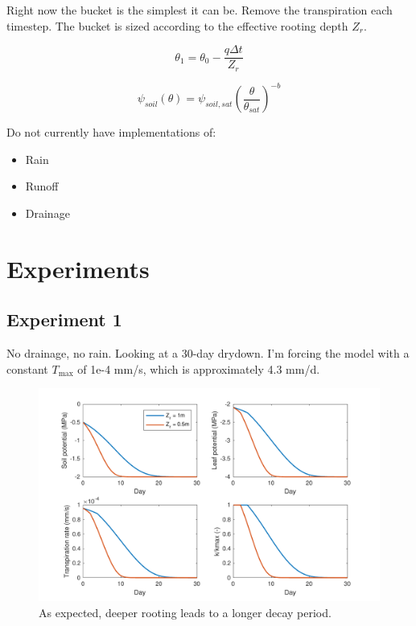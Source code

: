 \documentclass[11pt]{article}
\begin{document}
Right now the bucket is the simplest it can be. Remove the transpiration each timestep. The bucket is sized according to the effective rooting depth $Z_r$.

\begin{equation}
\theta_1 = \theta_0 - \dfrac{q\Delta t}{Z_r}
\end{equation}

\begin{equation}
\psi_{soil}\left(\theta\right) = \psi_{soil,sat}\left(\dfrac{\theta}{\theta_{sat}}\right)^{-b}
\end{equation}

Do not currently have implementations of:
\begin{itemize}
\item Rain
\item Runoff
\item Drainage
\end{itemize}


\clearpage
\section{Experiments}

\subsection{Experiment 1}
No drainage, no rain. Looking at a 30-day drydown. I'm forcing the model with a constant $T_\text{max}$ of 1e-4 mm/s, which is approximately 4.3 mm/d. 

\begin{figure}[h]
\centering
\includegraphics[width=35pc]{../figs/exp1}
\caption{As expected, deeper rooting leads to a longer decay period.}
\label{fig:exp1}
\end{figure}
\end{document}
